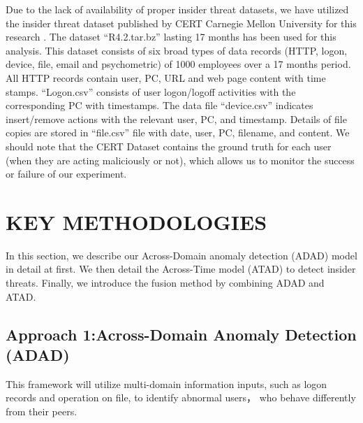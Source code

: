 \documentclass[conference]{IEEEtran}
\begin{document}
Due to the lack of availability of proper insider threat datasets, we have utilized the insider threat dataset published by CERT Carnegie Mellon University for this research \cite{b17}. The dataset “R4.2.tar.bz” lasting 17 months has been used for this analysis. This dataset consists of six broad types of data records (HTTP, logon, device, file, email and psychometric) of 1000 employees over a 17 months period. All HTTP records contain user, PC, URL and web page content with time stamps. “Logon.csv” consists of user logon/logoff activities with the corresponding PC with timestamps. The data file “device.csv” indicates insert/remove actions with the relevant user, PC, and timestamp. Details of file copies are stored in “file.csv” file with date, user, PC, filename, and content. We should note that the CERT Dataset contains the ground truth for each user (when they are acting maliciously or not), which allows us to monitor the success or failure of our experiment.

\section{KEY METHODOLOGIES}
In this section, we describe our Across-Domain anomaly detection (ADAD) model in detail at first. We then detail the Across-Time model (ATAD) to detect insider threats. Finally, we introduce the fusion method by combining ADAD and ATAD.

\subsection{Approach 1:Across-Domain Anomaly Detection (ADAD)}\label{AA}
This framework will utilize multi-domain information inputs, such as logon records and operation on file, to identify abnormal users， who behave differently from their peers.

\end{document}
